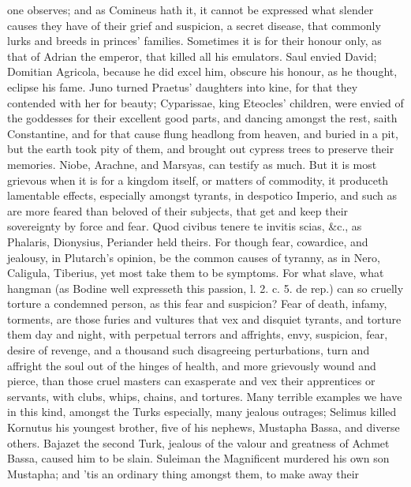{one observes; and as Comineus hath it, it cannot be expressed
what slender causes they have of their grief and suspicion, a secret
disease, that commonly lurks and breeds in princes' families. Sometimes
it is for their honour only, as that of Adrian the emperor, that
killed all his emulators. Saul envied David; Domitian Agricola, because
he did excel him, obscure his honour, as he thought, eclipse his fame.
Juno turned Praetus' daughters into kine, for that they contended with
her for beauty; Cyparissae, king Eteocles' children, were envied
of the goddesses for their excellent good parts, and dancing amongst
the rest, saith Constantine, and for that cause flung headlong
from heaven, and buried in a pit, but the earth took pity of them, and
brought out cypress trees to preserve their memories. Niobe,
Arachne, and Marsyas, can testify as much. But it is most grievous when
it is for a kingdom itself, or matters of commodity, it produceth
lamentable effects, especially amongst tyrants, in despotico Imperio,
and such as are more feared than beloved of their subjects, that get
and keep their sovereignty by force and fear. Quod civibus tenere
te invitis scias, \&c., as Phalaris, Dionysius, Periander held theirs.
For though fear, cowardice, and jealousy, in Plutarch's opinion, be the
common causes of tyranny, as in Nero, Caligula, Tiberius, yet most take
them to be symptoms. For what slave, what hangman (as Bodine well
expresseth this passion, l. 2. c. 5. de rep.) can so cruelly torture a
condemned person, as this fear and suspicion? Fear of death, infamy,
torments, are those furies and vultures that vex and disquiet tyrants,
and torture them day and night, with perpetual terrors and affrights,
envy, suspicion, fear, desire of revenge, and a thousand such
disagreeing perturbations, turn and affright the soul out of the hinges
of health, and more grievously wound and pierce, than those cruel
masters can exasperate and vex their apprentices or servants, with
clubs, whips, chains, and tortures. Many terrible examples we have in
this kind, amongst the Turks especially, many jealous outrages;
Selimus killed Kornutus his youngest brother, five of his
nephews, Mustapha Bassa, and diverse others. Bajazet the second
Turk, jealous of the valour and greatness of Achmet Bassa, caused him
to be slain. Suleiman the Magnificent murdered his own son
Mustapha; and 'tis an ordinary thing amongst them, to make away their
}
